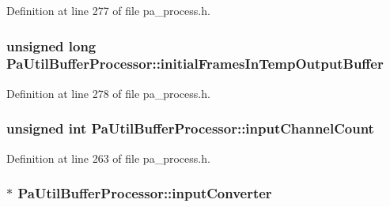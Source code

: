 Definition at line 277 of file pa\+\_\+process.\+h.

\subsubsection[{\texorpdfstring{initial\+Frames\+In\+Temp\+Output\+Buffer}{initialFramesInTempOutputBuffer}}]{\setlength{\rightskip}{0pt plus 5cm}unsigned long Pa\+Util\+Buffer\+Processor\+::initial\+Frames\+In\+Temp\+Output\+Buffer}\hypertarget{struct_pa_util_buffer_processor_aec8e9dfce47109ff1f1d8cfa3c411c74}{}\label{struct_pa_util_buffer_processor_aec8e9dfce47109ff1f1d8cfa3c411c74}


Definition at line 278 of file pa\+\_\+process.\+h.

\subsubsection[{\texorpdfstring{input\+Channel\+Count}{inputChannelCount}}]{\setlength{\rightskip}{0pt plus 5cm}unsigned {\bf int} Pa\+Util\+Buffer\+Processor\+::input\+Channel\+Count}\hypertarget{struct_pa_util_buffer_processor_a878ec922a2464a3d57119d175f362366}{}\label{struct_pa_util_buffer_processor_a878ec922a2464a3d57119d175f362366}


Definition at line 263 of file pa\+\_\+process.\+h.

\subsubsection[{\texorpdfstring{input\+Converter}{inputConverter}}]{$\ast$ Pa\+Util\+Buffer\+Processor\+::input\+Converter}\hypertarget{struct_pa_util_buffer_processor_a8bad04b047411362da5a81c38dde04af}{}\label{struct_pa_util_buffer_processor_a8bad04b047411362da5a81c38dde04af}


